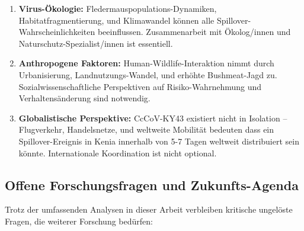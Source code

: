 \documentclass[11pt,a4paper]{article}
\theoremstyle{definition}
\begin{document}
\begin{enumerate}
\item \textbf{Virus-Ökologie:} Fledermauspopulations-Dynamiken, Habitatfragmentierung, und Klimawandel können alle Spillover-Wahrscheinlichkeiten beeinflussen. Zusammenarbeit mit Ökolog/innen und Naturschutz-Spezialist/innen ist essentiell.

\item \textbf{Anthropogene Faktoren:} Human-Wildlife-Interaktion nimmt durch Urbanisierung, Land\-nutzungs-Wandel, und erhöhte Bushmeat-Jagd zu. Sozialwissenschaftliche Perspektiven auf Risiko-Wahrnehmung und Verhaltensänderung sind notwendig.

\item \textbf{Globalistische Perspektive:} CcCoV-KY43 existiert nicht in Isolation -- Flugverkehr, Handelsnetze, und weltweite Mobilität bedeuten dass ein Spillover-Ereignis in Kenia innerhalb von 5-7 Tagen weltweit distribuiert sein könnte. Internationale Koordination ist nicht optional.
\end{enumerate}

\subsection{Offene Forschungsfragen und Zukunfts-Agenda}

Trotz der umfassenden Analysen in dieser Arbeit verbleiben kritische ungelöste Fragen, die weiterer Forschung bedürfen:
\end{document}
